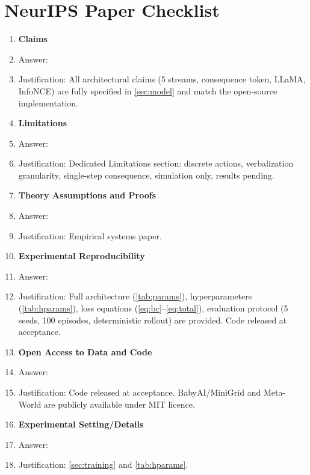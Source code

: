 \documentclass{article}
\begin{document}
\newpage
\section*{NeurIPS Paper Checklist}

\begin{enumerate}

\item {\bf Claims}
    \item[] Answer: \answerYes{}
    \item[] Justification: All architectural claims (5 streams, consequence
      token, LLaMA, InfoNCE) are fully specified in \cref{sec:model} and
      match the open-source implementation.

\item {\bf Limitations}
    \item[] Answer: \answerYes{}
    \item[] Justification: Dedicated Limitations section: discrete actions,
      verbalization granularity, single-step consequence, simulation only,
      results pending.

\item {\bf Theory Assumptions and Proofs}
    \item[] Answer: \answerNA{}
    \item[] Justification: Empirical systems paper.

\item {\bf Experimental Reproducibility}
    \item[] Answer: \answerYes{}
    \item[] Justification: Full architecture (\cref{tab:params}),
      hyperparameters (\cref{tab:hparams}), loss equations
      (\cref{eq:bc}--\cref{eq:total}), evaluation protocol (5 seeds,
      100 episodes, deterministic rollout) are provided.
      Code released at acceptance.

\item {\bf Open Access to Data and Code}
    \item[] Answer: \answerNA{}
    \item[] Justification: Code released at acceptance.
      BabyAI/MiniGrid and Meta-World are publicly available under MIT licence.

\item {\bf Experimental Setting/Details}
    \item[] Answer: \answerYes{}
    \item[] Justification: \cref{sec:training} and \cref{tab:hparams}.


\end{enumerate}
\end{document}
